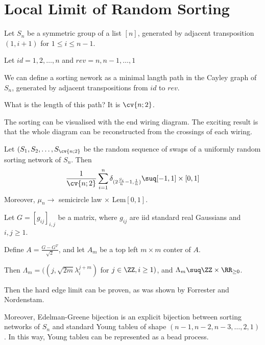 \documentclass[11pt]{scrartcl}
\begin{document}
\section{Local Limit of Random Sorting}
Let $S_n$ be a symmetric group of a list $[n]$, generated by adjacent
transposition $(1, i+1)$ for $1\leq i \leq n-1$.

Let $id = 1, 2, \dots, n$ and $rev = n, n-1, \dots, 1$

We can define a sorting nework as a minimal langth path in the Cayley
graph of $S_n$, generated by adjacent transpositions from $id$ to
$rev$.

What is the length of this path? It is $\cv{n; 2}$.

The sorting can be visualised with the end wiring diagram. The
exciting result is that the whole diagram can be reconstructed from
the crossings of each wiring.

\begin{theorem}[AHRV, 08]
  Let $(S_1, S_2, \dots, S_{\cv{n;2}}$ be the random sequence of swaps
  of a uniformly random sorting network of $S_n$.
  Then
  \[
    \frac{1}{\cv{n;2}}\sum_{i=1}^n\delta_{(2 \frac{S_i}{n}-1, \frac{1}{n})} \suq [-1, 1]\times[0, 1]
  \]
  Moreover, $\mu_n \to$ semicircle law $\times$ Lem$[0, 1]$.
\end{theorem}


Let $G = [g_{ij}]_{i, j}$ be a matrix, where $g_{ij}$ are iid standard real Gaussians and $i, j \geq 1$.

Define $A = \frac{G-G^T}{\sqrt{2}}$, and let $A_m$ be a top left
$m\times m$ conter of $A$.

Then $\Lambda_m = ((j, \sqrt{2m} \lambda_i^{j+m})$ for
$j\in \ZZ, i \geq 1)$, and $\Lambda_m\suq \ZZ\times\RR_{\geq 0}$.

Then the hard edge limit can be proven, as was shown by Forrester and Nordenstam.

Moreover, Edelman-Greene bijection is an explicit bijection between sorting networks of $S_n$ and standard Young tableu of shape $(n-1, n-2, n-3, \dots, 2, 1)$. In this way, Young tableu can be represented as a bead process.
\end{document}
